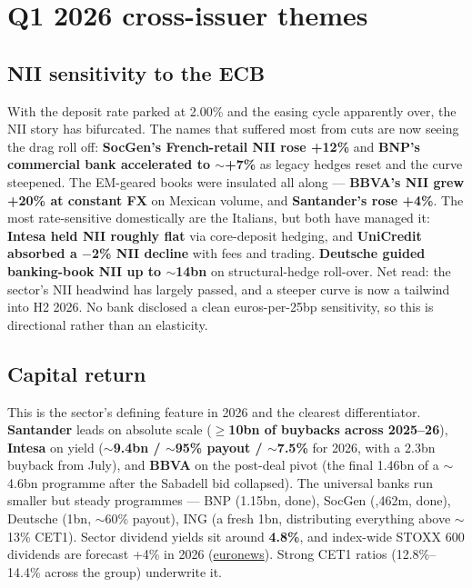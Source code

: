 \documentclass[10pt,a4paper]{article}
\begin{document}
\section{Q1 2026 cross-issuer themes}

\subsection*{NII sensitivity to the ECB}
With the deposit rate parked at 2.00\% and the easing cycle apparently over, the NII story has bifurcated. The names that suffered most from cuts are now seeing the drag roll off: \textbf{SocGen's French-retail NII rose +12\%} and \textbf{BNP's commercial bank accelerated to $\sim$+7\%} as legacy hedges reset and the curve steepened. The EM-geared books were insulated all along --- \textbf{BBVA's NII grew +20\% at constant FX} on Mexican volume, and \textbf{Santander's rose +4\%}. The most rate-sensitive domestically are the Italians, but both have managed it: \textbf{Intesa held NII roughly flat} via core-deposit hedging, and \textbf{UniCredit absorbed a $-$2\% NII decline} with fees and trading. \textbf{Deutsche guided banking-book NII up to $\sim$\texteuro14bn} on structural-hedge roll-over. Net read: the sector's NII headwind has largely passed, and a steeper curve is now a tailwind into H2 2026. No bank disclosed a clean euros-per-25bp sensitivity, so this is directional rather than an elasticity.

\subsection*{Capital return}
This is the sector's defining feature in 2026 and the clearest differentiator. \textbf{Santander} leads on absolute scale (\textbf{$\geq$\texteuro10bn of buybacks across 2025--26}), \textbf{Intesa} on yield (\textbf{$\sim$\texteuro9.4bn / $\sim$95\% payout / $\sim$7.5\%} for 2026, with a \texteuro2.3bn buyback from July), and \textbf{BBVA} on the post-deal pivot (the final \texteuro1.46bn of a $\sim$\texteuro4.6bn programme after the Sabadell bid collapsed). The universal banks run smaller but steady programmes --- BNP (\texteuro1.15bn, done), SocGen (,462m, done), Deutsche (\texteuro1bn, $\sim$60\% payout), ING (a fresh \texteuro1bn, distributing everything above $\sim$13\% CET1). Sector dividend yields sit around \textbf{4.8\%}, and index-wide STOXX 600 dividends are forecast +4\% in 2026 (\href{https://www.euronews.com/business/2025/12/13/european-banks-best-record-whats-the-outlook-for-2026}{euronews}). Strong CET1 ratios (12.8\%--14.4\% across the group) underwrite it.
\end{document}
